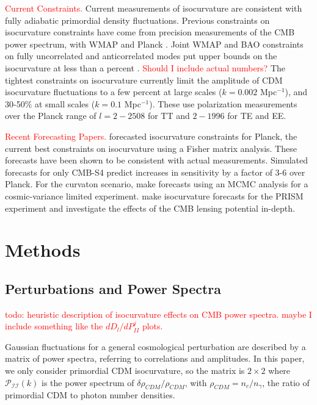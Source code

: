\documentclass{emulateapj}
\newcommand\writingnote[1]{\textcolor{red}{#1}}
\newcommand\pii{ \mathcal{P}_{\mathcal{I}\mathcal{I}} }
\begin{document}
\writingnote{Current Constraints.}
Current measurements of isocurvature are consistent with fully adiabatic primordial density fluctuations. Previous constraints on isocurvature constraints have come from precision measurements of the CMB power spectrum, with WMAP \citep{moodley/etal:2004} and Planck \citep{planckXXII:2013}. Joint WMAP and BAO constraints on fully uncorrelated and anticorrelated modes put upper bounds on the isocurvature at less than a percent \citep{hinshaw/etal:2013}. \writingnote{Should I include actual numbers?} The tightest constraints on isocurvature \citep{planckXX:2015} currently limit the amplitude of CDM isocurvature fluctuations to a few percent at large scales ($k=0.002$ Mpc$^{-1}$), and 30-50\% at small scales ($k=0.1$ Mpc$^{-1}$). These use polarization measurements over the Planck range of $l=2-2508$ for TT and $2-1996$ for TE and EE.


\writingnote{Recent Forecasting Papers.}
\cite{bucher/etal:2001} forecasted isocurvature constraints for Planck, the current best constraints on isocurvature using a Fisher matrix analysis. These forecasts have been shown to be consistent with actual measurements. Simulated forecasts for only CMB-S4 \citep{CMB-S4:2016} predict increases in sensitivity by a factor of 3-6 over Planck. For the curvaton scenario, \cite{smith/grin:2016} make forecasts using an MCMC analysis for a cosmic-variance limited experiment. \cite{kasanda/moodley:2014} make isocurvature forecasts for the PRISM experiment and investigate the effects of the CMB lensing potential in-depth.



\section{Methods}


\subsection{Perturbations and Power Spectra}

\writingnote{
todo: heuristic description of isocurvature effects on CMB power spectra. maybe I include something like the $dD_l/dP_{II}^j$ plots.
}


Gaussian fluctuations for a general cosmological perturbation are described by a matrix of power spectra, referring to correlations and amplitudes. In this paper, we only consider primordial CDM isocurvature, so the matrix is $2 \times 2$ where $\pii(k)$ is the power spectrum of $\delta \rho_{CDM} / \rho_{CDM}$, with $\rho_{CDM} = n_c / n_{\gamma}$, the ratio of primordial CDM to photon number densities.
\end{document}
